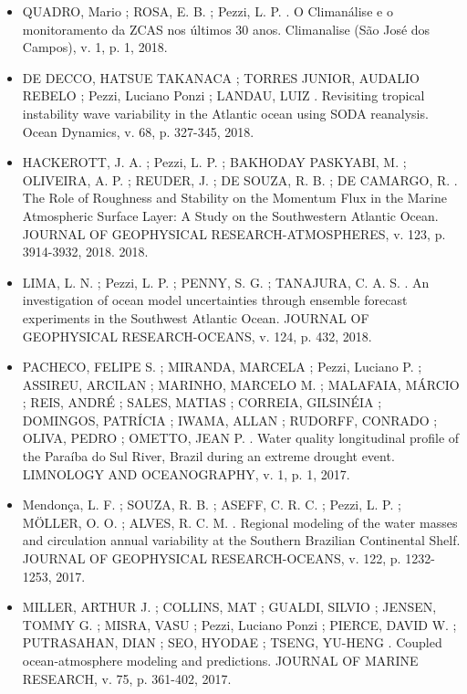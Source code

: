 \documentclass[11pt, a4paper]{awesome-cv}
\begin{document}
\begin{cvletter}
\begin{itemize}
  \item[] QUADRO, Mario ; ROSA, E. B. ; Pezzi, L. P. . O Climanálise e o monitoramento da ZCAS nos 
  últimos 30 anos. Climanalise (São José dos Campos), v. 1, p. 1, 2018. 

  \item[] DE DECCO, HATSUE TAKANACA ; TORRES JUNIOR, AUDALIO REBELO ; Pezzi, Luciano Ponzi ; 
  LANDAU, LUIZ . Revisiting tropical instability wave variability in the Atlantic ocean using 
  SODA reanalysis. Ocean Dynamics, v. 68, p. 327-345, 
  2018.

  \item[] HACKEROTT, J. A. ; Pezzi, L. P. ; BAKHODAY PASKYABI, M. ; OLIVEIRA, A. P. ; REUDER, J. ; 
  DE SOUZA, R. B. ; DE CAMARGO, R. . The Role of Roughness and Stability on the Momentum Flux in 
  the Marine Atmospheric Surface Layer: A Study on the Southwestern Atlantic Ocean. JOURNAL OF 
  GEOPHYSICAL RESEARCH-ATMOSPHERES, v. 123, p. 3914-3932, 2018. 
  2018.

  \item[] LIMA, L. N. ; Pezzi, L. P. ; PENNY, S. G. ; TANAJURA, C. A. S. . An investigation of ocean 
  model uncertainties through ensemble forecast experiments in the Southwest Atlantic Ocean. 
  JOURNAL OF GEOPHYSICAL RESEARCH-OCEANS, v. 124, p. 432,
  2018.

  \item[] PACHECO, FELIPE S. ; MIRANDA, MARCELA ; Pezzi, Luciano P. ; ASSIREU, ARCILAN ; MARINHO, 
  MARCELO M. ; MALAFAIA, MÁRCIO ; REIS, ANDRÉ ; SALES, MATIAS ; CORREIA, GILSINÉIA ; DOMINGOS, 
  PATRÍCIA ; IWAMA, ALLAN ; RUDORFF, CONRADO ; OLIVA, PEDRO ; OMETTO, JEAN P. . Water quality 
  longitudinal profile of the Paraíba do Sul River, Brazil during an extreme drought event. 
  LIMNOLOGY AND OCEANOGRAPHY, v. 1, p. 1,
  2017.

  \item[] Mendonça, L. F. ; SOUZA, R. B. ; ASEFF, C. R. C. ; Pezzi, L. P. ; MÖLLER, O. O. ; 
  ALVES, R. C. M. . Regional modeling of the water masses and circulation annual variability 
  at the Southern Brazilian Continental Shelf. JOURNAL OF GEOPHYSICAL RESEARCH-OCEANS, v. 
  122, p. 1232-1253,
  2017.

  \item[] MILLER, ARTHUR J. ; COLLINS, MAT ; GUALDI, SILVIO ; JENSEN, TOMMY G. ; MISRA, VASU ; Pezzi, 
  Luciano Ponzi ; PIERCE, DAVID W. ; PUTRASAHAN, DIAN ; SEO, HYODAE ; TSENG, YU-HENG . 
  Coupled ocean-atmosphere modeling and predictions. JOURNAL OF MARINE RESEARCH, v. 75, p. 
  361-402,
  2017.


\end{itemize}
\end{cvletter}
\end{document}
